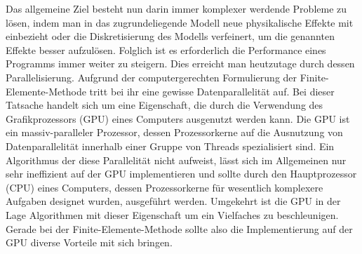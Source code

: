 \documentclass[crop=false]{standalone}
\begin{document}
    Das allgemeine Ziel besteht nun darin immer komplexer werdende Probleme zu lösen, indem man in das zugrundeliegende Modell neue physikalische Effekte mit einbezieht oder die Diskretisierung des Modells verfeinert, um die genannten Effekte besser aufzulösen.
    Folglich ist es erforderlich die Performance eines Programms immer weiter zu steigern.
    Dies erreicht man heutzutage durch dessen Parallelisierung.
    Aufgrund der computergerechten Formulierung der Finite-Elemente-Methode tritt bei ihr eine gewisse Datenparallelität auf.
    Bei dieser Tatsache handelt sich um eine Eigenschaft, die durch die Verwendung des Grafikprozessors (GPU) eines Computers ausgenutzt werden kann.
    Die GPU ist ein massiv-paralleler Prozessor, dessen Prozessorkerne auf die Ausnutzung von Datenparallelität innerhalb einer Gruppe von Threads spezialisiert sind.
    Ein Algorithmus der diese Parallelität nicht aufweist, lässt sich im Allgemeinen nur sehr ineffizient auf der GPU implementieren und sollte durch den Hauptprozessor (CPU) eines Computers, dessen Prozessorkerne für wesentlich komplexere Aufgaben designet wurden, ausgeführt werden.
    Umgekehrt ist die GPU in der Lage Algorithmen mit dieser Eigenschaft um ein Vielfaches zu beschleunigen.
    Gerade bei der Finite-Elemente-Methode sollte also die Implementierung auf der GPU diverse Vorteile mit sich bringen.
    \cite{Patterson2011,Kirk2010,Sanders2011}

\end{document}
